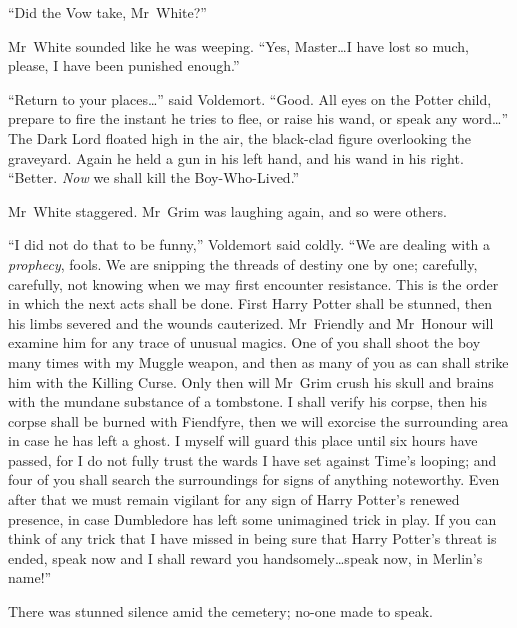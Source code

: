 “Did the Vow take, Mr~White?”

Mr~White sounded like he was weeping. “Yes, Master…I have lost so much, please, I have been punished enough.”

“Return to your places…” said Voldemort. “Good. All eyes on the Potter child, prepare to fire the instant he tries to flee, or raise his wand, or speak any word…” The Dark Lord floated high in the air, the black-clad figure overlooking the graveyard. Again he held a gun in his left hand, and his wand in his right. “Better. \emph{Now} we shall kill the Boy-Who-Lived.”

Mr~White staggered. Mr~Grim was laughing again, and so were others.

“I did not do that to be funny,” Voldemort said coldly. “We are dealing with a \emph{prophecy}, fools. We are snipping the threads of destiny one by one; carefully, carefully, not knowing when we may first encounter resistance. This is the order in which the next acts shall be done. First Harry Potter shall be stunned, then his limbs severed and the wounds cauterized. Mr~Friendly and Mr~Honour will examine him for any trace of unusual magics. One of you shall shoot the boy many times with my Muggle weapon, and then as many of you as can shall strike him with the Killing Curse. Only then will Mr~Grim crush his skull and brains with the mundane substance of a tombstone. I shall verify his corpse, then his corpse shall be burned with Fiendfyre, then we will exorcise the surrounding area in case he has left a ghost. I myself will guard this place until six hours have passed, for I do not fully trust the wards I have set against Time’s looping; and four of you shall search the surroundings for signs of anything noteworthy. Even after that we must remain vigilant for any sign of Harry Potter’s renewed presence, in case Dumbledore has left some unimagined trick in play. If you can think of any trick that I have missed in being sure that Harry Potter’s threat is ended, speak now and I shall reward you handsomely…speak now, in Merlin’s name!”

There was stunned silence amid the cemetery; no-one made to speak.

